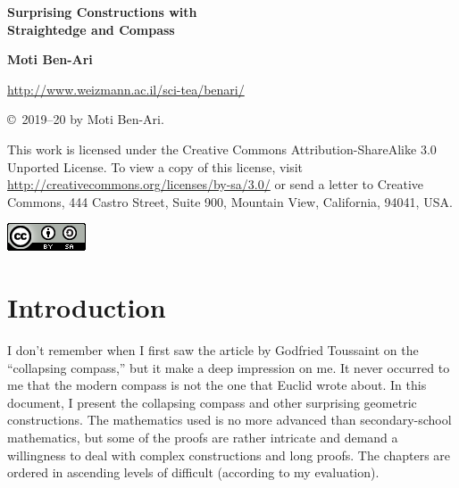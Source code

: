 
\thispagestyle{empty}

\begin{center}
\textbf{\LARGE Surprising Constructions with\\\bigskip Straightedge and Compass}

\bigskip
\bigskip
\bigskip
\bigskip

\textbf{\Large Moti Ben-Ari}

\bigskip
\bigskip

\url{http://www.weizmann.ac.il/sci-tea/benari/}
\end{center}



\vfill

\begin{footnotesize}
\begin{center}
\copyright{}\ 2019--20 by Moti Ben-Ari.
\end{center}

This work is licensed under the Creative Commons Attribution-ShareAlike 3.0 Unported License. To view a copy of this license, visit \url{http://creativecommons.org/licenses/by-sa/3.0/} or send a letter to Creative Commons, 444 Castro Street, Suite 900, Mountain View, California, 94041, USA.
\end{footnotesize}

\bigskip

\begin{center}
\includegraphics[width=.15\textwidth]{../../by-sa.png}
\end{center}

\newpage
\thispagestyle{empty}
\mbox{}
\newpage
\thispagestyle{empty}

\tableofcontents
\newpage
\mbox{}
\newpage

\chapter*{Introduction}

I don't remember when I first saw the article by Godfried Toussaint \cite{toussaint} on the ``collapsing compass,'' but it make a deep impression on me. It never occurred to me that the modern compass is not the one that Euclid wrote about. In this document, I present the collapsing compass and other surprising geometric constructions. The mathematics used is no more advanced than secondary-school mathematics, but some of the proofs are rather intricate and demand a willingness to deal with complex constructions and long proofs. The chapters are ordered in ascending levels of difficult (according to my evaluation).

